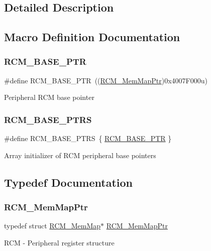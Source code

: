 \subsection{Detailed Description}


\subsection{Macro Definition Documentation}
\mbox{\label{group___r_c_m___peripheral_ga25ab3aa8d593d455ed36a52c77f88234}} 
\subsubsection{\texorpdfstring{R\+C\+M\+\_\+\+B\+A\+S\+E\+\_\+\+P\+TR}{RCM\_BASE\_PTR}}
{\footnotesize\ttfamily \#define R\+C\+M\+\_\+\+B\+A\+S\+E\+\_\+\+P\+TR~((\hyperlink{group___r_c_m___peripheral_ga787b1c58d947f0b81c2502227dd0396b}{R\+C\+M\+\_\+\+Mem\+Map\+Ptr})0x4007\+F000u)}

Peripheral R\+CM base pointer \mbox{\label{group___r_c_m___peripheral_gad8549fec4a09b0b485983beadfc3a5fb}} 
\subsubsection{\texorpdfstring{R\+C\+M\+\_\+\+B\+A\+S\+E\+\_\+\+P\+T\+RS}{RCM\_BASE\_PTRS}}
{\footnotesize\ttfamily \#define R\+C\+M\+\_\+\+B\+A\+S\+E\+\_\+\+P\+T\+RS~\{ \hyperlink{group___r_c_m___peripheral_ga25ab3aa8d593d455ed36a52c77f88234}{R\+C\+M\+\_\+\+B\+A\+S\+E\+\_\+\+P\+TR} \}}

Array initializer of R\+CM peripheral base pointers 

\subsection{Typedef Documentation}
\mbox{\label{group___r_c_m___peripheral_ga787b1c58d947f0b81c2502227dd0396b}} 
\subsubsection{\texorpdfstring{R\+C\+M\+\_\+\+Mem\+Map\+Ptr}{RCM\_MemMapPtr}}
{\footnotesize\ttfamily typedef struct \hyperlink{struct_r_c_m___mem_map}{R\+C\+M\+\_\+\+Mem\+Map}$\ast$ \hyperlink{group___r_c_m___peripheral_ga787b1c58d947f0b81c2502227dd0396b}{R\+C\+M\+\_\+\+Mem\+Map\+Ptr}}

R\+CM -\/ Peripheral register structure 